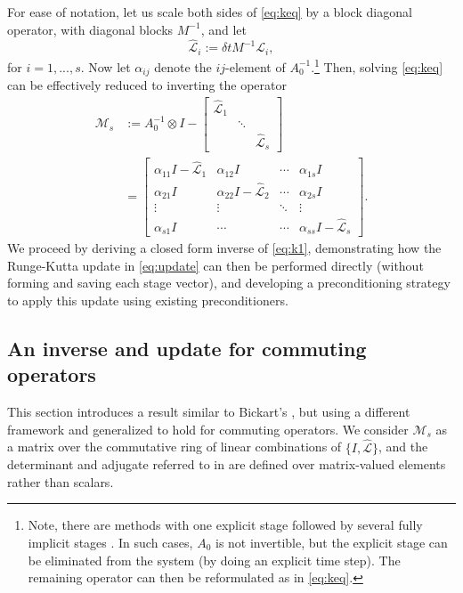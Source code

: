 \documentclass[review]{siamart}
\begin{document}
For ease of notation, let us scale both sides of \eqref{eq:keq} by a block
diagonal operator, with diagonal blocks $M^{-1}$, and let
%
\begin{equation*}
\widehat{\mathcal{L}}_i := \delta t M^{-1}\mathcal{L}_i,
\end{equation*}
%
for $i=1,...,s$. Now let $\alpha_{ij}$ denote the $ij$-element
of $A_0^{-1}$.\footnote{Note, there are
methods with one explicit stage followed by several fully implicit stages \cite{butcher00}.
In such cases, $A_0$ is not invertible, but the explicit stage can
be eliminated from the system (by doing an explicit time step). The remaining operator
can then be reformulated as in \eqref{eq:keq}.}
Then, solving \eqref{eq:keq} can be effectively reduced to inverting the operator
%
\begin{align}\nonumber
\mathcal{M}_s & := A_0^{-1}\otimes I - \begin{bmatrix} \widehat{\mathcal{L}}_1  & \\ & \ddots \\ && \widehat{\mathcal{L}}_s\end{bmatrix} \\
& = \begin{bmatrix} \alpha_{11}I - \widehat{\mathcal{L}}_1 & \alpha_{12}I & \cdots & \alpha_{1s}I \\
	\alpha_{21}I & \alpha_{22}I - \widehat{\mathcal{L}}_2 & \cdots & \alpha_{2s}I \\
	\vdots & \vdots & \ddots & \vdots \\ \alpha_{s1}I & \cdots & \cdots & \alpha_{ss}I - \widehat{\mathcal{L}}_s \end{bmatrix}.
	\label{eq:k1}
\end{align}
%
We proceed by deriving a closed form inverse of \eqref{eq:k1}, demonstrating
how the Runge-Kutta update in \eqref{eq:update} can then be performed directly
(without forming and saving each stage vector), and developing a preconditioning
strategy to apply this update using existing preconditioners.

\subsection{An inverse and update for commuting operators}\label{sec:solve:inv}

This section introduces a result similar to Bickart's \cite{bickart77},
but using a different framework and generalized to hold for commuting
operators. We consider $\mathcal{M}_s$ as a matrix over the commutative
ring of linear combinations of $\{I, \widehat{\mathcal{L}}\}$,
and the determinant and adjugate referred to in  are defined
over matrix-valued elements rather than scalars.
\end{document}
